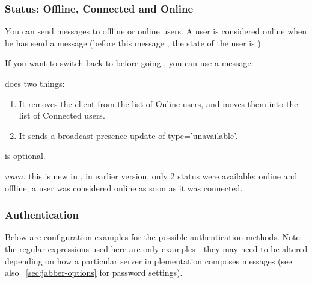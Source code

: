 \documentclass{IDXDOC-en}
\begin{document}
\subsubsection{Status: Offline, Connected and Online}

You can send messages to offline or online users. A user is considered
online when he has send a  message (before
this message , the state of the user is ).

If you want to switch back to  before going
, you can use a  message:

 does two things:
\begin{enumerate}
\item It removes the client from the list of Online users, and moves
  them into the list of Connected users.
\item  It sends a broadcast presence update of type='unavailable'.
\end{enumerate}

 is optional.

\emph{warn:} this is new in , in earlier version, only 2
status were available: online and offline; a user was considered
online as soon as it was connected.

\subsubsection{Authentication}

Below are configuration examples for the possible authentication
methods.  Note: the regular expressions used here are only examples -
they may need to be altered depending on how a particular server
implementation composes messages (see also ~\ref{sec:jabber-options}
for password settings).
\end{document}
